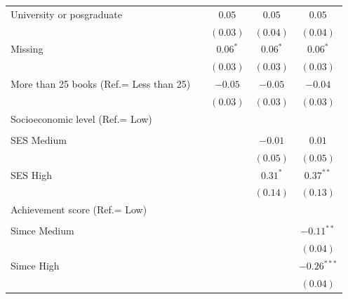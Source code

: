 \documentclass[
    behavsci,
    article,
    submit,
moreauthors
]{mdpi}
\begin{document}
\begin{table}
{\begin{center}
{\begin{threeparttable}
\begin{tabular}{l c c c c}
\quad University or posgraduate           &               & $0.05$        & $0.05$        & $0.05$        \\
                                          &               & $(0.03)$      & $(0.04)$      & $(0.04)$      \\
\quad Missing                             &               & $0.06^{*}$    & $0.06^{*}$    & $0.06^{*}$    \\
                                          &               & $(0.03)$      & $(0.03)$      & $(0.03)$      \\
More than 25 books (Ref.= Less than 25)   &               & $-0.05$       & $-0.05$       & $-0.04$       \\
                                          &               & $(0.03)$      & $(0.03)$      & $(0.03)$      \\
Socioeconomic level (Ref.= Low)           &               &               &               &               \\
                                          &               &               &               &               \\
\quad SES Medium                          &               &               & $-0.01$       & $0.01$        \\
                                          &               &               & $(0.05)$      & $(0.05)$      \\
\quad SES High                            &               &               & $0.31^{*}$    & $0.37^{**}$   \\
                                          &               &               & $(0.14)$      & $(0.13)$      \\
Achievement score (Ref.= Low)             &               &               &               &               \\
                                          &               &               &               &               \\
\quad Simce Medium                        &               &               &               & $-0.11^{**}$  \\
                                          &               &               &               & $(0.04)$      \\
\quad Simce High                          &               &               &               & $-0.26^{***}$ \\
                                          &               &               &               & $(0.04)$      \\

\end{tabular}
\end{threeparttable}}
\end{center}}
\end{table}
\end{document}
